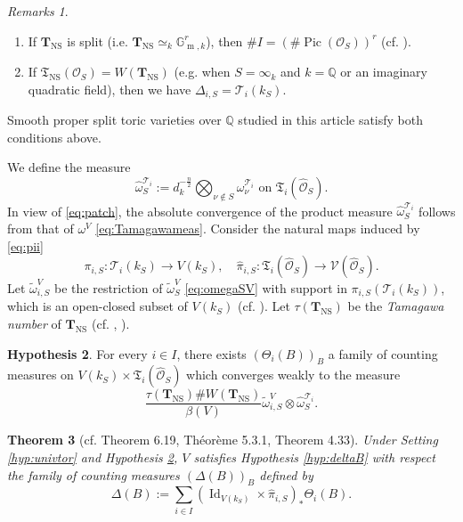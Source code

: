 \documentclass[11pt,letterpaper]{amsart}
\newcommand{\BQ}{{\mathbb {Q}}}
\newcommand{\CO}{{\mathcal {O}}}
\newcommand{\CV}{{\mathcal {V}}}
\newcommand{\CTUT}{\mathcal{T}}
\newcommand{\FTUT}{\mathfrak{T}}
\newcommand{\CTNS}{\mathbf{T}_{\operatorname{NS}}}
\newcommand{\FTNS}{\mathfrak{T}_{\operatorname{NS}}}
\theoremstyle{plain}
\numberwithin{equation}{section}
\newtheorem{theorem}{Theorem}[section]
\theoremstyle{definition}
\newtheorem{hypothesis1}[theorem]{Hypothesis}
\theoremstyle{remark}
\newtheorem{remarks}[theorem]{Remarks}
\begin{document}
\begin{remarks}
	\hfill
	\begin{enumerate}
		\item 	If $\CTNS$ is split (i.e. $\CTNS\simeq_k \mathbb{G}_{\operatorname{m},k}^{r}$), then $\# I =(\#\operatorname{Pic}(\CO_S))^r$ (cf. \cite[Theorem 2.7]{Frei-Pieropan}).
		\item  If $\FTNS(\CO_S)=W(\CTNS)$ (e.g. when $S=\infty_k$ and $k=\BQ$ or an imaginary quadratic field), then we have $\varDelta_{i,S}=\CTUT_i(k_S)$.
	\end{enumerate}
	Smooth proper split toric varieties over $\BQ$ studied in this article satisfy both conditions above. 
\end{remarks}

We define the measure
\begin{equation}\label{eq:measS}
\widehat{\omega}_S^{\CTUT_i}:=d_k^{-\frac{n}{2}}\bigotimes_{\nu\notin S}\omega_\nu^{\CTUT_i}\text{ on } \FTUT_i(\widehat{\CO}_S).
\end{equation} In view of \eqref{eq:patch}, the absolute convergence of the product measure $\widehat{\omega}_S^{\CTUT_i}$ follows from that of $\omega^V$ \eqref{eq:Tamagawameas}.
Consider the natural maps induced by \eqref{eq:pii} $$\pi_{i,S}:\CTUT_i(k_S)\to V(k_S),\quad \widehat{\pi}_{i,S}:\FTUT_i(\widehat{\CO}_S)\to \CV(\widehat{\CO}_S).$$ Let $\widetilde{\omega}_{i,S}^V$ be the restriction of $\widetilde{\omega}_S^V$ \eqref{eq:omegaSV} with support in $\pi_{i,S}\left(\CTUT_i(k_S)\right)$, which is an open-closed subset of $V(k_S)$ (cf. \cite[Proposition 5.20]{Salberger}).  Let $\tau(\CTNS)$ be the \emph{Tamagawa number} of $\CTNS$ (cf. \cite[D\'efinition 3.1.5]{Peyre2}, \cite[p. 251]{PeyreBeyond}).
\begin{hypothesis1}\label{hyp:Tamamagauniv}
	For every $i\in I$, there exists $(\Theta_i(B))_B$ a family of counting measures on $V(k_S)\times\FTUT_i(\widehat{\CO}_S)$ which converges weakly to  the measure \begin{equation}\label{eq:Tamagamameaunivtor}
		\frac{\tau(\CTNS)\# W(\CTNS)}{\beta(V)}\widetilde{\omega}_{i,S}^V\otimes \widehat{\omega}_S^{\CTUT_i}.
	\end{equation}
\end{hypothesis1}
\begin{theorem}[cf. \cite{Salberger} Theorem 6.19, \cite{Peyre2} Théorème 5.3.1, \cite{PeyreBeyond} Theorem 4.33]\label{thm:equidistunivtor}
	Under Setting \ref{hyp:univtor} and Hypothesis \ref{hyp:Tamamagauniv}, $V$ satisfies Hypothesis \ref{hyp:deltaB} with respect the family of counting measures $(\Delta(B))_B$ defined by \begin{equation}\label{eq:DeltaTheta}
		\Delta(B):=\sum_{i\in I}(\operatorname{Id}_{V(k_S)}\times\widehat{\pi}_{i,S})_{*}\Theta_i(B).
	\end{equation}
\end{theorem}
\end{document}
